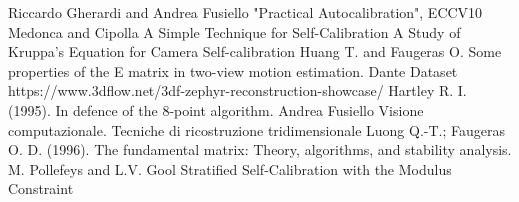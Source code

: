 \documentclass[11pt]{article}
\begin{document}
\begin{thebibliography}{100}
    \addtolength{\leftmargin}{0.2in}
    \setlength{\itemindent}{-0.2in}

     Riccardo Gherardi and Andrea Fusiello "Practical Autocalibration", ECCV10
     Medonca and Cipolla A Simple Technique for Self-Calibration
     A Study of Kruppa’s Equation for Camera Self-calibration
     Huang T. and Faugeras O. Some properties of the E matrix in two-view motion estimation. 
     Dante Dataset https://www.3dflow.net/3df-zephyr-reconstruction-showcase/
     Hartley R. I. (1995). In defence of the 8-point algorithm.
     Andrea Fusiello Visione computazionale. Tecniche di ricostruzione tridimensionale
     Luong Q.-T.; Faugeras O. D. (1996). The fundamental matrix: Theory, algorithms, and stability analysis.
     M. Pollefeys and L.V. Gool Stratified Self-Calibration with the Modulus Constraint
\end{thebibliography}
\end{document}
